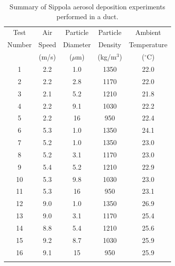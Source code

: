 \begin{table}[!ht]
\centering
\caption[Summary of Sippola aerosol deposition experiments]
{Summary of Sippola aerosol deposition experiments performed in a duct.}
\begin{tabular}{ccccc}
\hline\noalign{\smallskip}
Test      &  Air     &  Particle  &  Particle    &  Ambient      \\
Number    &  Speed   &  Diameter  &  Density     &  Temperature  \\
          &  (m/s)   &  ($\mu$m)  &  (kg/m$^3$)  &  ($^\circ$C)  \\
\noalign{\smallskip}\hline\noalign{\smallskip}
1         &  2.2     &  1.0       &  1350        &  22.0         \\
2         &  2.2     &  2.8       &  1170        &  22.0         \\
3         &  2.1     &  5.2       &  1210        &  21.8         \\
4         &  2.2     &  9.1       &  1030        &  22.2         \\
5         &  2.2     &  16        &  950         &  22.4         \\
6         &  5.3     &  1.0       &  1350        &  24.1         \\
7         &  5.2     &  1.0       &  1350        &  23.0         \\
8         &  5.2     &  3.1       &  1170        &  23.0         \\
9         &  5.4     &  5.2       &  1210        &  22.9         \\
10        &  5.3     &  9.8       &  1030        &  23.0         \\
11        &  5.3     &  16        &  950         &  23.1         \\
12        &  9.0     &  1.0       &  1350        &  26.9         \\
13        &  9.0     &  3.1       &  1170        &  25.4         \\
14        &  8.8     &  5.4       &  1210        &  25.6         \\
15        &  9.2     &  8.7       &  1030        &  25.9         \\
16        &  9.1     &  15        &  950         &  25.9         \\
\noalign{\smallskip}\hline
\end{tabular}
\label{tab:Sippola_Aerosol_Deposition_Summary}
\end{table}


